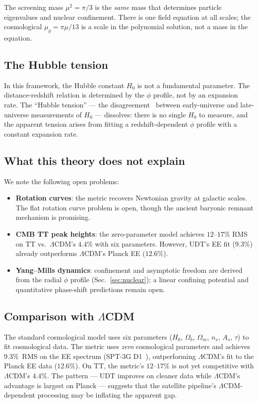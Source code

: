 \documentclass[aps,prd,twocolumn,superscriptaddress,nofootinbib,longbibliography]{revtex4-2}
\newcommand{\mug}{\mu_g}
\begin{document}
The screening mass $\mu^2 = \pi/3$ is the \emph{same} mass that
determines particle eigenvalues and nuclear confinement.  There is one
field equation at all scales; the cosmological $\mug = \pi\mu/13$ is a
scale in the polynomial solution, not a mass in the equation.

\subsection{The Hubble tension}

In this framework, the Hubble constant $H_0$ is not a fundamental
parameter.  The distance-redshift relation is determined by the
$\phi$ profile, not by an expansion rate.  The ``Hubble tension'' ---
the disagreement~\cite{Riess2022,Verde2019} between early-universe and late-universe
measurements of $H_0$ --- dissolves: there is no single $H_0$ to
measure, and the apparent tension arises from fitting a
redshift-dependent $\phi$ profile with a constant expansion rate.

\subsection{What this theory does not explain}

We note the following open problems:
\begin{itemize}
\item \textbf{Rotation curves}: the metric recovers Newtonian gravity
  at galactic scales.  The flat rotation curve problem is open, though
  the ancient baryonic remnant mechanism is promising.
\item \textbf{CMB TT peak heights}: the zero-parameter model achieves
  $12$--$17\%$ RMS on TT vs.\ $\Lambda$CDM's $4.4\%$ with six
  parameters.  However, UDT's EE fit ($9.3\%$) already outperforms
  $\Lambda$CDM's Planck EE ($12.6\%$).
\item \textbf{Yang--Mills dynamics}: confinement and asymptotic
  freedom are derived from the radial $\phi$ profile
  (Sec.~\ref{sec:nuclear}); a linear confining potential and
  quantitative phase-shift predictions remain open.
\end{itemize}

\subsection{Comparison with $\Lambda$CDM}

The standard cosmological model uses six parameters
($H_0$, $\Omega_b$, $\Omega_m$, $n_s$, $A_s$, $\tau$) to fit
cosmological data.  The metric uses \emph{zero} cosmological
parameters and achieves $9.3\%$~RMS on the EE spectrum (SPT-3G D1~\cite{SPT3GD1}),
outperforming $\Lambda$CDM's fit to the Planck EE data ($12.6\%$).
On TT, the metric's $12$--$17\%$ is not yet competitive with
$\Lambda$CDM's $4.4\%$.  The pattern --- UDT improves on cleaner
data while $\Lambda$CDM's advantage is largest on Planck ---
suggests that the satellite pipeline's $\Lambda$CDM-dependent
processing may be inflating the apparent gap.
\end{document}
